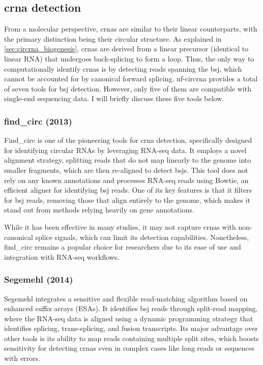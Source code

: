 \subsection{\gls{crna} detection}
\label{subsec:circrna_detection}
From a molecular perspective, \glspl{crna} are similar to their linear
counterparts, with the primary distinction being their circular structure.
As explained in \cref{sec:circrna_biogenesis}, \glspl{crna} are derived from a
linear precursor (identical to linear RNA) that undergoes back-splicing to form
a loop.
Thus, the only way to computationally identify \glspl{crna} is by detecting
reads spanning the \gls{bsj}, which cannot be accounted for by canonical
forward splicing.
\gls{nf-circrna} provides a total of seven tools for \gls{bsj}
detection.
However, only five of them are compatible with single-end sequencing data.
I will briefly discuss these five tools below.

\subsubsection{find\_circ (2013)}
Find\_circ is one of the pioneering tools for \gls{crna} detection,
specifically designed for identifying circular RNAs by leveraging RNA-seq data.
It employs a novel alignment strategy, splitting reads that do not map linearly
to the genome into smaller fragments, which are then re-aligned to detect
\glspl{bsj}\supercite{memczak_circular_2013}.
This tool does not rely on any known annotations and processes RNA-seq reads
using Bowtie, an efficient aligner for identifying \gls{bsj} reads.
One of its key features is that it filters for \gls{bsj} reads, removing those
that align entirely to the genome, which makes it stand out from methods
relying heavily on gene annotations\supercite{memczak_circular_2013}.

While it has been effective in many studies, it may not capture \glspl{crna}
with non-canonical splice signals, which can limit its detection
capabilities\supercite{sekar_circular_2018,liu_prkra_2022}.
Nonetheless, find\_circ remains a popular choice for researchers due to its
ease of use and integration with RNA-seq workflows.

\subsubsection{Segemehl (2014)}
Segemehl integrates a sensitive and flexible read-matching algorithm based on
enhanced suffix arrays (ESAs).
It identifies \gls{bsj} reads through split-read mapping, where the RNA-seq
data is aligned using a dynamic programming strategy that identifies splicing,
trans-splicing, and fusion transcripts.
Its major advantage over other tools is its ability to map reads containing
multiple split sites, which boosts sensitivity for detecting \glspl{crna} even
in complex cases like long reads or sequences with
errors\supercite{hoffmann_multi-split_2014}.

